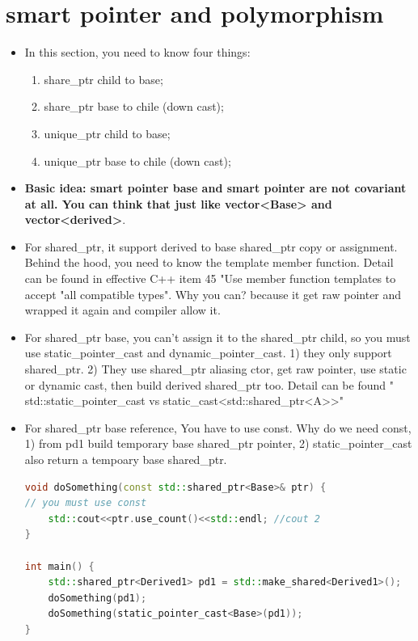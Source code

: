 \documentclass[a4paper,12pt,twoside]{book}
\begin{document}
\section{smart pointer and polymorphism}

\begin{itemize}
\item In this section, you need to know four things:
\begin{enumerate}
\item share\_ptr child to base;
\item share\_ptr base to chile (down cast);
\item unique\_ptr child to base;
\item unique\_ptr base to chile (down cast);
\end{enumerate}

		\item \textbf{Basic idea: smart pointer base and smart pointer are not covariant at all. You can think that just like vector<Base> and vector<derived>}.

		\item For shared\_ptr, it support derived to base shared\_ptr copy or assignment. Behind the hood, you need to know the template member function. Detail can be found in effective C++ item 45 "Use member function templates to accept "all compatible types". Why you can? because it get raw pointer and wrapped it again and compiler allow it.

		\item  For shared\_ptr base, you can't assign it to the shared\_ptr child, so you must use static\_pointer\_cast and dynamic\_pointer\_cast. 1) they only support shared\_ptr. 2) They use shared\_ptr aliasing ctor, get raw pointer, use static or dynamic cast, then build derived shared\_ptr too. Detail can be found "
std::static\_pointer\_cast vs static\_cast<std::shared\_ptr<A>>"

\item For shared\_ptr base reference, You have to use const. Why do we need const, 1) from pd1 build temporary base shared\_ptr pointer, 2) static\_pointer\_cast also return a tempoary base shared\_ptr.
\begin{lstlisting}[frame=single, language=c++, mathescape=true]
void doSomething(const std::shared_ptr<Base>& ptr) {
// you must use const
    std::cout<<ptr.use_count()<<std::endl; //cout 2
}

int main() {
    std::shared_ptr<Derived1> pd1 = std::make_shared<Derived1>();
    doSomething(pd1);
	doSomething(static_pointer_cast<Base>(pd1));
} 
\end{lstlisting}



\end{itemize}
\end{document}
